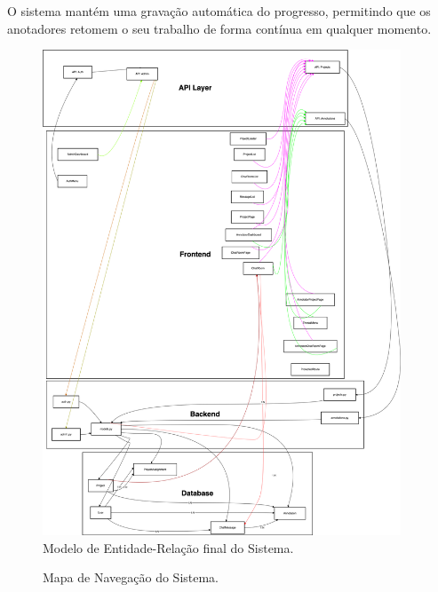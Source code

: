 O sistema mantém uma gravação automática do progresso, permitindo que os anotadores retomem o seu trabalho de forma contínua em qualquer momento.


\begin{figure}[p]
    \centering
    \includegraphics[width=0.95\textwidth,height=0.95\textheight,keepaspectratio]{images/2A-ERT-B.drawio.png}
    \caption{Modelo de Entidade-Relação final do Sistema.}
    \label{fig:modelo-er}
\end{figure}

\begin{landscape}
    \begin{figure}[p]
        \centering
        \caption{Mapa de Navegação do Sistema.}
        \label{fig:mapa-navegacao}
    \end{figure}
\end{landscape}